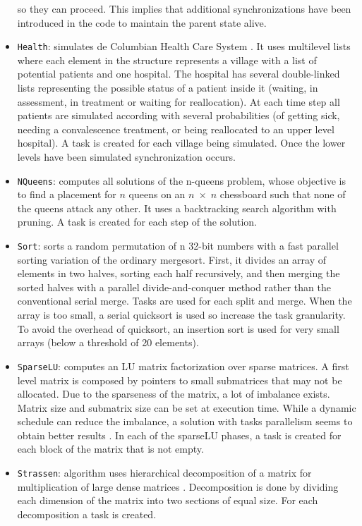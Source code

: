 \documentclass[sigconf]{acmart}
\begin{document}
\begin{itemize}
so they can proceed. This implies that additional synchronizations have been
introduced in the code to maintain the parent state alive.
\item \texttt{Health}: simulates de Columbian Health Care System \cite{?}. It
uses multilevel lists where each element in the structure  represents  a
village with  a  list  of  potential patients and one hospital. The hospital
has several double-linked lists representing the possible status of a patient
inside it (waiting, in assessment,   in   treatment   or   waiting   for
reallocation).  At  each time step  all  patients  are  simulated  according
with several probabilities (of getting sick, needing a convalescence treatment,
or  being  reallocated to  an  upper  level  hospital).  A  task  is  created
for  each  village being  simulated.  Once  the lower   levels   have   been
simulated synchronization   occurs. 
\item \texttt{NQueens}: computes  all  solutions  of  the n-queens
problem, whose objective is to find a placement for $n$ queens on an $n \;
\times \; n$ chessboard such that none of the queens attack any other. It uses
a backtracking search algorithm with pruning. A task is created for each step
of the solution.
\item \texttt{Sort}: sorts a random permutation of n 32-bit numbers with  a
fast  parallel  sorting  variation  \cite{mergesort}  of  the  ordinary
mergesort.  First, it divides an array of elements in two halves, sorting  each
half  recursively,  and  then  merging  the  sorted halves with a parallel
divide-and-conquer method rather than the  conventional  serial  merge.  Tasks
are  used  for  each  split and merge. When the array is too small, a serial
quicksort is used  so increase  the  task  granularity.  To  avoid  the
overhead of  quicksort,  an insertion  sort  is  used  for  very  small  arrays
(below a threshold of 20 elements).
\item \texttt{SparseLU}: computes an LU matrix factorization over
sparse matrices. A first level matrix is composed by pointers to  small
submatrices  that  may  not  be  allocated.  Due  to  the sparseness  of  the
matrix,  a  lot  of  imbalance  exists.  Matrix size and submatrix size can be
set at execution time. While a dynamic schedule can reduce the imbalance, a
solution with tasks parallelism seems to obtain better results \cite{}. In each
of the sparseLU  phases,  a  task  is  created  for  each  block  of  the
matrix that is not empty.
\item \texttt{Strassen}: algorithm  uses  hierarchical  decomposition of a
matrix for multiplication of large dense matrices \cite{}. Decomposition is
done by dividing each dimension of the matrix into  two  sections  of  equal
size. For each decomposition a task is created. 
\end{itemize}
\end{document}
